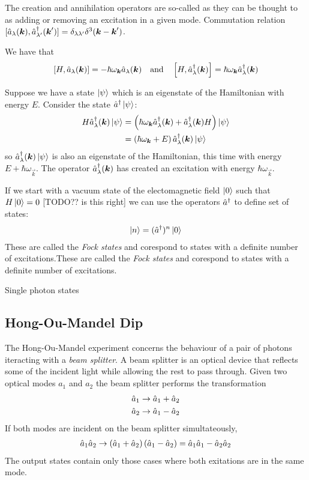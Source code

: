 The creation and annihilation operators are so-called as they can be thought to as adding or removing an excitation in a given mode. Commutation relation $[\hat{a}_\lambda({\boldsymbol{k}}), \hat{a}^\dagger_{\lambda '}({\boldsymbol{k}}')]  = \delta_{\lambda\lambda '}\delta^3({\boldsymbol{k}} - {\boldsymbol{k}}') $.

We have that
\begin{align}
  \left[H, \hat{a}_\lambda({\boldsymbol{k}})\right] = -\hbar \omega_{{\boldsymbol{k}}} \hat{a}_\lambda({\boldsymbol{k}})
  \quad \text{and} \quad 
  \left[H, \hat{a}^\dagger_\lambda({\boldsymbol{k}})\right] = \hbar \omega_{{\boldsymbol{k}}} \hat{a}^\dagger_\lambda({\boldsymbol{k}})
\end{align}

Suppose we have a state $\left\vert\psi\right\rangle$ which is an eigenstate of the Hamiltonian with energy $E$. Consider the state $\hat{a}^\dagger\left\vert\psi\right\rangle$:
\begin{align}
  H\hat{a}^\dagger_\lambda({\boldsymbol{k}})\left\vert\psi\right\rangle &= \left(\hbar \omega_{{\boldsymbol{k}}} \hat{a}^\dagger_\lambda({\boldsymbol{k}}) + \hat{a}^\dagger_\lambda({\boldsymbol{k}})H\right) \left\vert\psi\right\rangle \\
  &= \left(\hbar \omega_{{\boldsymbol{k}}} + E\right) \hat{a}^\dagger_\lambda({\boldsymbol{k}})\left\vert\psi\right\rangle
\end{align}
so $\hat{a}^\dagger_\lambda({\boldsymbol{k}})\left\vert\psi\right\rangle$ is also an eigenstate of the Hamiltonian, this time with energy $E + \hbar\omega_\vec{k}$. The operator $\hat{a}^\dagger_\lambda({\boldsymbol{k}})$ has created an excitation with energy $\hbar \omega_\vec{k}$.

If we start with a vacuum state of the electomagnetic field $\left\vert0\right\rangle$ such that $H\left\vert0\right\rangle = 0$ [TODO?? is this right] we can use the operators $\hat{a}^\dagger$ to define set of states:
\begin{align}
  \left\vert n\right\rangle = (\hat{a}^\dagger)^n \left\vert0\right\rangle
\end{align}
These are called the \textit{Fock states} and corespond to states with a definite number of excitations.These are called the \textit{Fock states} and corespond to states with a definite number of excitations.  


Single photon states

\subsection{Hong-Ou-Mandel Dip}

The Hong-Ou-Mandel experiment concerns the behaviour of a pair of photons iteracting with a \textit{beam splitter}. A beam splitter is an optical device that reflects some of the incident light while allowing the rest to pass through. Given two optical modes $a_1$ and $a_2$ the beam splitter performs the transformation
\begin{align}
  \hat{a}_{1} \rightarrow \hat{a}_{1} + \hat{a}_{2} \\
  \hat{a}_{2} \rightarrow \hat{a}_{1} - \hat{a}_{2}
\end{align}
If both modes are incident on the beam splitter simultateously,
\begin{align}
  \hat{a}_{1}\hat{a}_{2} \rightarrow \left(\hat{a}_{1} + \hat{a}_{2}\right) \left(\hat{a}_{1} - \hat{a}_{2}\right) = \hat{a}_{1}\hat{a}_{1} - \hat{a}_{2}\hat{a}_{2}
\end{align}
The output states contain only those cases where both exitations are in the same mode.

